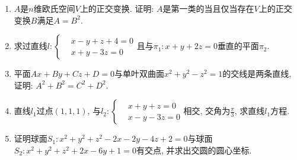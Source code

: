 \documentclass[12pt,a4paper,openany]{book}
\begin{document}
\begin{enumerate}
\item $A$是$n$维欧氏空间$V$上的正交变换. 证明: $A$是第一类的当且仅当存在$V$上的正交变换$B$满足$A = B^2$.

\item 求过直线$l: \left\{ \begin{aligned} &x - y + z + 4 = 0 \\ &x + y - 3z = 0 \end{aligned} \right.$且与$\pi_1: x + y + 2z =  0$垂直的平面$\pi_2$.

\item 平面$Ax + By + Cz + D = 0$与单叶双曲面$x^2 + y^2 - z^2 = 1$的交线是两条直线, 证明: $A^2 + B^2 = C^2 + D^2$.

\item 直线$l_1$过点$(1, 1, 1)$, 与$l_2: \left\{ \begin{aligned} &x+y+z = 0 \\ &x-y-3z=0 \end{aligned} \right.$相交, 交角为$\displaystyle\frac{\pi}{3}$, 求直线$l_1$方程.

\item 证明球面$S_1: x^2 + y^2 + z^2 -2x -2y -4z + 2 = 0$与球面$S_2: x^2 + y^2 + z^2 +2x -6y+1=0$有交点, 并求出交圆的圆心坐标.
\end{enumerate}
\end{document}
